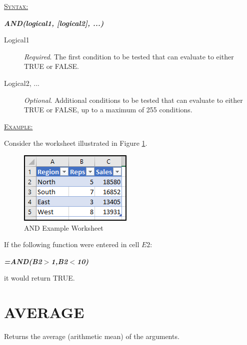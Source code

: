 \begin{addmargin}[1cm]{0cm}
	
	\medskip
	\underline{\textsc{Syntax:}}
	\medskip
	
	{\color{Syntax}
		\noindent\textit{\textbf{AND(logical1, [logical2], ...)}}
	}
	
	\begin{description}
		\item[Logical1] \textit{Required}. The first condition to be tested that can evaluate to either TRUE or FALSE.
		\item[Logical2, ...] \textit{Optional}. Additional conditions to be tested that can evaluate to either TRUE or FALSE, up to a maximum of 255 conditions.
	\end{description}

	\medskip
	\noindent\underline{\textsc{Example:}}
	\medskip

	\noindent Consider the worksheet illustrated in Figure \ref{apa:and}.
	
	\begin{figure}[H]
		\centering
		\includegraphics[width=\maxwidth{.45\linewidth}]{gfx/apa_fig01}
		\caption{AND Example Worksheet}
		\label{apa:and}
	\end{figure}

	\noindent If the following function were entered in cell $ E2 $:

	{\color{Syntax}
	\textit{\textbf{=AND(B2$>$1,B2$<$10)}}
	}

	\noindent it would return TRUE.

\end{addmargin}

\section{AVERAGE}

Returns the average (arithmetic mean) of the arguments.

